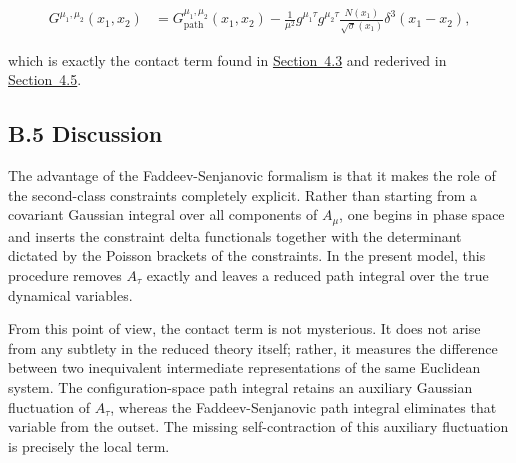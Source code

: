 \begin{align}
G^{\mu _{1},\mu _{2}}(x_{1},x_{2}) & =G_{\mathrm{path}}^{\mu _{1},\mu _{2}}(x_{1},x_{2})-\frac{1}{\mu ^{2}}g^{\mu _{1}\tau }g^{\mu _{2}\tau }\frac{N(x_{1})}{\sqrt{ \sigma }(x_{1})}\delta ^{3}(x_{1}-x_{2}),
\end{align}

which is exactly the contact term found in \hyperref[subsec:explicit-euclidean-correlation-function]{Section~4.3} and rederived in \hyperref[subsec:path-integral-contact-term]{Section~4.5}.

\subsection{B.5 Discussion}\label{subsec:fs-discussion}

The advantage of the Faddeev-Senjanovic formalism is that it makes the role of the second-class constraints completely explicit. Rather than starting from a covariant Gaussian integral over all components of $A_{\mu}$, one begins in phase space and inserts the constraint delta functionals together with the determinant dictated by the Poisson brackets of the constraints. In the present model, this procedure removes $A_{\tau}$ exactly and leaves a reduced path integral over the true dynamical variables.

From this point of view, the contact term is not mysterious. It does not arise from any subtlety in the reduced theory itself; rather, it measures the difference between two inequivalent intermediate representations of the same Euclidean system. The configuration-space path integral retains an auxiliary Gaussian fluctuation of $A_{\tau}$, whereas the Faddeev-Senjanovic path integral eliminates that variable from the outset. The missing self-contraction of this auxiliary fluctuation is precisely the local term.
